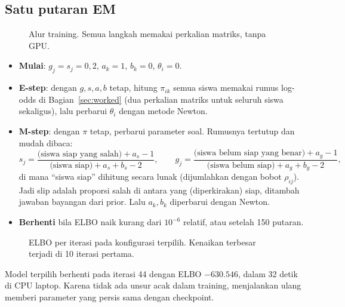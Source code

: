 \documentclass[11pt,a4paper]{article}
\begin{document}
\subsection{Satu putaran EM}

\begin{figure}[h]
  \centering
  \resizebox{0.95\linewidth}{!}{}
  \caption{Alur training. Semua langkah memakai perkalian matriks, tanpa GPU.}
\end{figure}

\begin{itemize}
  \item \textbf{Mulai}: $g_j=s_j=0{,}2$, $a_k=1$, $b_k=0$, $\theta_i=0$.
  \item \textbf{E-step}: dengan $g,s,a,b$ tetap, hitung $\pi_{ik}$ semua siswa memakai rumus log-odds di Bagian~\ref{sec:worked}
        (dua perkalian matriks untuk seluruh siswa sekaligus), lalu perbarui $\theta_i$ dengan metode Newton.
  \item \textbf{M-step}: dengan $\pi$ tetap, perbarui parameter soal. Rumusnya tertutup dan mudah dibaca:
        \[
          s_j=\frac{\text{(siswa siap yang salah)}+a_s-1}{\text{(siswa siap)}+a_s+b_s-2},\qquad
          g_j=\frac{\text{(siswa belum siap yang benar)}+a_g-1}{\text{(siswa belum siap)}+a_g+b_g-2},
        \]
        di mana ``siswa siap'' dihitung secara lunak (dijumlahkan dengan bobot $\rho_{ij}$). Jadi slip adalah
        proporsi salah di antara yang (diperkirakan) siap, ditambah jawaban bayangan dari prior. Lalu $a_k,b_k$
        diperbarui dengan Newton.
  \item \textbf{Berhenti} bila ELBO naik kurang dari $10^{-6}$ relatif, atau setelah 150 putaran.
\end{itemize}

\begin{figure}[h]
  \centering
  \setlength\figH{4.3cm}
  \begin{minipage}{0.7\linewidth}\end{minipage}
  \caption{ELBO per iterasi pada konfigurasi terpilih. Kenaikan terbesar terjadi di 10 iterasi pertama.}
\end{figure}

Model terpilih berhenti pada iterasi 44 dengan ELBO $-630.546$, dalam 32 detik di CPU laptop. Karena tidak ada unsur
acak dalam training, menjalankan ulang memberi parameter yang persis sama dengan checkpoint.

\end{document}
